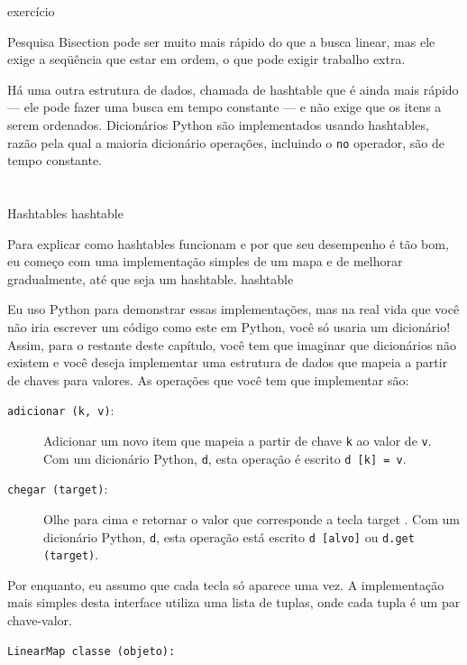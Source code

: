 \documentclass[10pt]{book}
\begin{document}
\begin{v erbatim}
\begin{}
\end{} exercício

Pesquisa Bisection pode ser muito mais rápido do que a busca linear, mas
ele exige a seqüência que estar em ordem, o que pode exigir
trabalho extra.

Há uma outra estrutura de dados, chamada de {hashtable \bf} que
é ainda mais rápido --- ele pode fazer uma busca em tempo constante --- e
não exige que os itens a serem ordenados. Dicionários Python
são implementados usando hashtables, razão pela qual a maioria dicionário
operações, incluindo o {\tt no} operador, são de tempo constante.


\section{} Hashtables
\label{} hashtable

Para explicar como hashtables funcionam e por que seu desempenho é tão
bom, eu começo com uma implementação simples de um mapa e de
melhorar gradualmente, até que seja um hashtable.
\index{} hashtable

Eu uso Python para demonstrar essas implementações, mas na real
vida que você não iria escrever um código como este em Python, você só usaria um
dicionário! Assim, para o restante deste capítulo, você tem que imaginar que
dicionários não existem e você deseja implementar uma estrutura de dados
que mapeia a partir de chaves para valores. As operações que você tem que
implementar são:

\begin{description}

\item[{\tt adicionar (k, v)}:] Adicionar um novo item que mapeia a partir de chave {\tt k}
ao valor de {\tt v}. Com um dicionário Python, {\tt d}, esta operação
é escrito {\tt d [k] = v}.

\item[{\tt chegar (target)}:] Olhe para cima e retornar o valor que corresponde
a tecla {target \tt}. Com um dicionário Python, {\tt d}, esta operação
está escrito {\tt d [alvo]} ou {\tt d.get (target)}.

\end{description}

Por enquanto, eu assumo que cada tecla só aparece uma vez.
A implementação mais simples desta interface utiliza uma lista de
tuplas, onde cada tupla é um par chave-valor.

\begin{verbatim}
LinearMap classe (objeto):


\end{verbatim}
\end{v erbatim}
\end{document}
